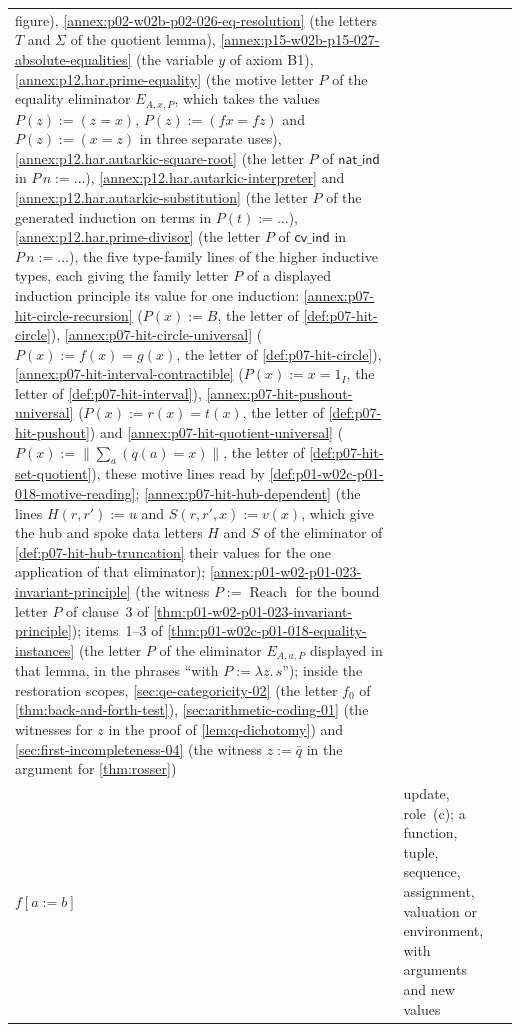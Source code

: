 \begin{longtable}{@{}p{}p{}p{}@{}}
figure), \cref{annex:p02-w02b-p02-026-eq-resolution} (the letters \(T\)
and \(\Sigma\) of the quotient lemma),
\cref{annex:p15-w02b-p15-027-absolute-equalities} (the variable \(y\) of
axiom B1), \cref{annex:p12.har.prime-equality} (the motive letter \(P\) of
the equality eliminator \(E_{A,x,P}\), which takes the values
\(P(z):=(z=x)\), \(P(z):=(f x=f z)\) and \(P(z):=(x=z)\) in three separate
uses), \cref{annex:p12.har.autarkic-square-root} (the letter \(P\) of
\(\mathsf{nat\_ind}\) in \(P\,n:=\ldots\)),
\cref{annex:p12.har.autarkic-interpreter} and
\cref{annex:p12.har.autarkic-substitution} (the letter \(P\) of the
generated induction on terms in \(P(t):=\ldots\)),
\cref{annex:p12.har.prime-divisor} (the letter \(P\) of
\(\mathsf{cv\_ind}\) in \(P\,n:=\ldots\)), the five type-family lines of
the higher inductive types, each giving the family letter \(P\) of a
displayed induction principle its value for one induction:
\cref{annex:p07-hit-circle-recursion} (\(P(x):=B\), the letter of
\cref{def:p07-hit-circle}), \cref{annex:p07-hit-circle-universal}
(\(P(x):=f(x)=g(x)\), the letter of \cref{def:p07-hit-circle}),
\cref{annex:p07-hit-interval-contractible} (\(P(x):=x=1_I\), the letter of
\cref{def:p07-hit-interval}), \cref{annex:p07-hit-pushout-universal}
(\(P(x):=r(x)=t(x)\), the letter of \cref{def:p07-hit-pushout}) and
\cref{annex:p07-hit-quotient-universal}
(\(P(x):=\|\sum_a(q(a)=x)\|\), the letter of
\cref{def:p07-hit-set-quotient}), these motive lines read by
\cref{def:p01-w02c-p01-018-motive-reading};
\cref{annex:p07-hit-hub-dependent} (the lines \(H(r,r'):=u\) and
\(S(r,r',x):=v(x)\), which give the hub and spoke data letters \(H\) and
\(S\) of the eliminator of \cref{def:p07-hit-hub-truncation} their values
for the one application of that eliminator);
\cref{annex:p01-w02-p01-023-invariant-principle} (the witness
\(P:=\operatorname{Reach}\) for the bound letter \(P\) of clause~3 of
\cref{thm:p01-w02-p01-023-invariant-principle}); items~1--3 of
\cref{thm:p01-w02c-p01-018-equality-instances} (the letter \(P\) of the
eliminator \(E_{A,a,P}\) displayed in that lemma, in the phrases ``with
\(P:=\lambda z.\,s\)'');
inside the restoration scopes, \cref{sec:qe-categoricity-02} (the letter
\(f_0\) of \cref{thm:back-and-forth-test}), \cref{sec:arithmetic-coding-01}
(the witnesses for \(z\) in the proof of \cref{lem:q-dichotomy}) and
\cref{sec:first-incompleteness-04} (the witness \(z:=\bar q\) in the argument
for \cref{thm:rosser}) \\
\(f[a:=b]\) & update, role~(c); a function, tuple, sequence, assignment,
valuation or environment, with arguments and new values &

\end{longtable}
